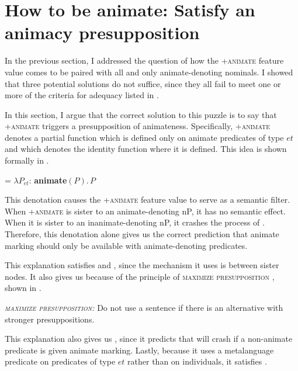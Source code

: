 \documentclass[output=paper,newtxmath,modfonts,nonflat,hidelinks]{langsci/langscibook}
\begin{document}
\section{How to be animate: Satisfy an animacy presupposition} \label{sec:pesetsky:satisfyapresupposition}

In the previous section, I addressed the question of how the +\textsc{animate} feature value comes to be paired with all and only animate-denoting nominals.  I showed that three potential solutions do not suffice, since they all fail to meet one or more of the criteria for adequacy listed in .

In this section, I argue that the correct solution to this puzzle is to say that +\textsc{animate} triggers a presupposition of animateness.  Specifically, +\textsc{animate} denotes a partial function which is defined only on animate predicates of type $et$ and which denotes the identity function where it is defined.  This idea is shown formally in .
 
\ea\label{ex:pesetsky:lambdas}  = $\lambda P_{et}: \,$\textbf{animate}$(P).\,P$ \z

This denotation causes the +\textsc{animate} feature value to serve as a semantic filter.  When +\textsc{animate} is sister to an animate-denoting nP, it has no semantic effect.  When it is sister to an inanimate-denoting nP, it crashes the process of . Therefore, this denotation alone gives us the correct prediction that animate marking should only be available with animate-denoting predicates.

This explanation satisfies  and , since the mechanism it uses is  between sister nodes.  It also gives us  because of the principle of \textsc{maximize presupposition} \citep{heim91}, shown in .

\ea\label{ex:pesetsky:maximize} \textit{\textsc{maximize presupposition}:} Do not use a sentence if there is an alternative with stronger presuppositions. \z

This explanation also gives us , since it predicts that  will crash if a non-animate predicate is given animate marking.  Lastly, because it uses a metalanguage predicate on predicates of type $et$ rather than on individuals, it satisfies .
\end{document}
